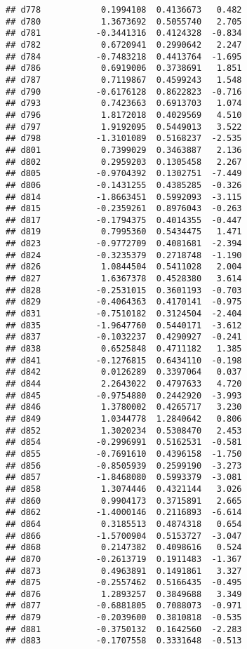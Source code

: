 \documentclass[
]{article}
\begin{document}
\begin{verbatim}
## d778            0.1994108  0.4136673   0.482
## d780            1.3673692  0.5055740   2.705
## d781           -0.3441316  0.4124328  -0.834
## d782            0.6720941  0.2990642   2.247
## d784           -0.7483218  0.4413764  -1.695
## d786            0.6919006  0.3738691   1.851
## d787            0.7119867  0.4599243   1.548
## d790           -0.6176128  0.8622823  -0.716
## d793            0.7423663  0.6913703   1.074
## d796            1.8172018  0.4029569   4.510
## d797            1.9192095  0.5449013   3.522
## d798           -1.3101089  0.5168237  -2.535
## d801            0.7399029  0.3463887   2.136
## d802            0.2959203  0.1305458   2.267
## d805           -0.9704392  0.1302751  -7.449
## d806           -0.1431255  0.4385285  -0.326
## d814           -1.8663451  0.5992093  -3.115
## d815           -0.2359261  0.8976043  -0.263
## d817           -0.1794375  0.4014355  -0.447
## d819            0.7995360  0.5434475   1.471
## d823           -0.9772709  0.4081681  -2.394
## d824           -0.3235379  0.2718748  -1.190
## d826            1.0844504  0.5411028   2.004
## d827            1.6367378  0.4528380   3.614
## d828           -0.2531015  0.3601193  -0.703
## d829           -0.4064363  0.4170141  -0.975
## d831           -0.7510182  0.3124504  -2.404
## d835           -1.9647760  0.5440171  -3.612
## d837           -0.1032237  0.4290927  -0.241
## d838            0.6525848  0.4711182   1.385
## d841           -0.1276815  0.6434110  -0.198
## d842            0.0126289  0.3397064   0.037
## d844            2.2643022  0.4797633   4.720
## d845           -0.9754880  0.2442920  -3.993
## d846            1.3780002  0.4265717   3.230
## d849            1.0344778  1.2840642   0.806
## d852            1.3020234  0.5308470   2.453
## d854           -0.2996991  0.5162531  -0.581
## d855           -0.7691610  0.4396158  -1.750
## d856           -0.8505939  0.2599190  -3.273
## d857           -1.8468080  0.5993379  -3.081
## d858            1.3074446  0.4321144   3.026
## d860            0.9904173  0.3715891   2.665
## d862           -1.4000146  0.2116893  -6.614
## d864            0.3185513  0.4874318   0.654
## d866           -1.5700904  0.5153727  -3.047
## d868            0.2147382  0.4098616   0.524
## d870           -0.2613719  0.1911483  -1.367
## d873            0.4963891  0.1491861   3.327
## d875           -0.2557462  0.5166435  -0.495
## d876            1.2893257  0.3849688   3.349
## d877           -0.6881805  0.7088073  -0.971
## d879           -0.2039600  0.3810818  -0.535
## d881           -0.3750132  0.1642560  -2.283
## d883           -0.1707558  0.3331648  -0.513

\end{verbatim}
\end{document}
